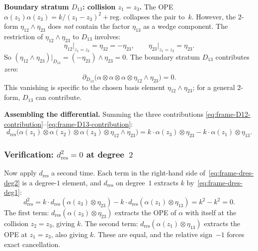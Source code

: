 \medskip
\noindent\textbf{Boundary stratum $D_{13}$: collision $z_1 = z_3$.}
The OPE $\alpha(z_1)\alpha(z_3) = k/(z_1 - z_3)^2 + \mathrm{reg.}$
collapses the pair to~$k$.  However, the $2$-form
$\eta_{12} \wedge \eta_{23}$ does \emph{not} contain the
factor $\eta_{13}$ as a wedge component.  The restriction of
$\eta_{12} \wedge \eta_{23}$ to $D_{13}$ involves:
\[
\eta_{12}\big|_{z_1 = z_3} = \eta_{32}
= -\eta_{23}, \qquad
\eta_{23}\big|_{z_1 = z_3} = \eta_{23}.
\]
So $(\eta_{12} \wedge \eta_{23})|_{D_{13}}
= (-\eta_{23}) \wedge \eta_{23} = 0$.
The boundary stratum $D_{13}$ contributes \emph{zero}:
\begin{equation}\label{eq:frame-D13-contribution}
\partial_{D_{13}}\bigl(
  \alpha \otimes \alpha \otimes \alpha \otimes
  \eta_{12} \wedge \eta_{23}
\bigr)
= 0.
\end{equation}
This vanishing is specific to the chosen basis element
$\eta_{12} \wedge \eta_{23}$; for a general $2$-form,
$D_{13}$ can contribute.

\medskip
\noindent\textbf{Assembling the differential.}
Summing the three contributions
\eqref{eq:frame-D12-contribution}--\eqref{eq:frame-D13-contribution}:
\begin{equation}\label{eq:frame-dres-deg2}
d_{\mathrm{res}}\bigl(\alpha(z_1) \otimes \alpha(z_2)
\otimes \alpha(z_3) \otimes \eta_{12} \wedge \eta_{23}\bigr)
= k \cdot \alpha(z_3) \otimes \eta_{23}
  - k \cdot \alpha(z_1) \otimes \eta_{13}.
\end{equation}

\subsubsection*{Verification: $d_{\mathrm{res}}^2 = 0$ at degree~$2$}

Now apply $d_{\mathrm{res}}$ a second time.  Each term in the
right-hand side of~\eqref{eq:frame-dres-deg2} is a degree-$1$
element, and $d_{\mathrm{res}}$ on degree~$1$ extracts $k$
by~\eqref{eq:frame-dres-deg1}:
\begin{equation}\label{eq:frame-dsquared-deg2}
d_{\mathrm{res}}^2 = k \cdot d_{\mathrm{res}}(\alpha(z_3)
\otimes \eta_{23}) - k \cdot d_{\mathrm{res}}(\alpha(z_1)
\otimes \eta_{13}) = k^2 - k^2 = 0.
\end{equation}
The first term: $d_{\mathrm{res}}(\alpha(z_3) \otimes \eta_{23})$
extracts the OPE of $\alpha$ with itself at the collision
$z_2 = z_3$, giving $k$.  The second term:
$d_{\mathrm{res}}(\alpha(z_1) \otimes \eta_{13})$ extracts the
OPE at $z_1 = z_3$, also giving $k$.  These are equal, and
the relative sign~$-1$ forces exact cancellation.

